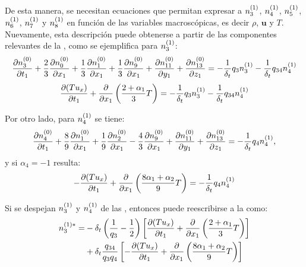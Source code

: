 De esta manera, se necesitan ecuaciones que permitan expresar a $n_{3}^{(1)}$, $n_{4}^{(1)}$, $n_{5}^{(1)}$, $n_{6}^{(1)}$, $n_{7}^{(1)}$ y $n_{8}^{(1)}$ en funci\'on de las variables macrosc\'opicas, es decir $\rho$, $\bm{u}$ y $T$. Nuevamente, esta descripci\'on puede obtenerse a partir de las componentes relevantes de la , como se ejemplifica para $n_{3}^{(1)}$:
\begin{equation}
	\dfrac{\partial n_{3}^{(0)}}{\partial t_1} 
	+ \dfrac{2}{3} \dfrac{\partial n_{0}^{(0)}}{\partial x_1}
	+ \dfrac{1}{3} \dfrac{\partial n_{1}^{(0)}}{\partial x_1}	
	+ \dfrac{1}{3} \dfrac{\partial n_{9}^{(0)}}{\partial x_1}	
	+ \dfrac{\partial n_{11}^{(0)}}{\partial y_1}	
	+ \dfrac{\partial n_{13}^{(0)}}{\partial z_1}	
	= -\dfrac{1}{\delta_t} q_3 n_{3}^{(1)} -\dfrac{1}{\delta_t} q_{34} n_{4}^{(1)}
\end{equation}
\begin{equation}
	\dfrac{\partial (Tu_x)}{\partial t_1} 
	+ \dfrac{\partial}{\partial x_1} \left( \dfrac{2+\alpha_1}{3}T \right)
	= -\dfrac{1}{\delta_t} q_3 n_{3}^{(1)} -\dfrac{1}{\delta_t} q_{34} n_{4}^{(1)}
	\label{eq:n3_eps1_3d}
\end{equation}

Por otro lado, para $n_{4}^{(1)}$ se tiene:
\begin{equation}
	\dfrac{\partial n_{4}^{(0)}}{\partial t_1} 
	+ \dfrac{8}{9} \dfrac{\partial n_{1}^{(0)}}{\partial x_1}
	+ \dfrac{1}{9} \dfrac{\partial n_{2}^{(0)}}{\partial x_1}	
	- \dfrac{4}{3} \dfrac{\partial n_{9}^{(0)}}{\partial x_1}	
	+ \dfrac{\partial n_{11}^{(0)}}{\partial y_1}	
	+ \dfrac{\partial n_{13}^{(0)}}{\partial z_1}	
	= -\dfrac{1}{\delta_t} q_4 n_{4}^{(1)},
\end{equation}
y si $\alpha_4=-1$ resulta:
\begin{equation}
	-\dfrac{\partial (Tu_x)}{\partial t_1} 
	+ \dfrac{\partial}{\partial x_1} \left( \dfrac{8\alpha_1+\alpha_2}{9}T \right)
	=-\dfrac{1}{\delta_t} q_4 n_{4}^{(1)}
	\label{eq:n4_eps1_3d}
\end{equation}

Si se despejan $n_{3}^{(1)}$ y $n_{4}^{(1)}$ de las , entonces puede reescribirse a la  como:
\begin{equation}
	\begin{aligned}
	    n_{3}^{(1)*} = &- \delta_t \left( \dfrac{1}{q_3} - \dfrac{1}{2} \right) \left[ \dfrac{\partial (Tu_x)}{\partial t_1} + \dfrac{\partial}{\partial x_1} \left( \dfrac{2+\alpha_1}{3}T \right) \right] \\
	    &+ \delta_t \dfrac{q_{34}}{q_3 q_4} \left[ -\dfrac{\partial (Tu_x)}{\partial t_1} + \dfrac{\partial}{\partial x_1} \left( \dfrac{8\alpha_1+\alpha_2}{9}T \right) \right]
	\end{aligned}
	\label{eq:n3star_final_3d}
\end{equation}

